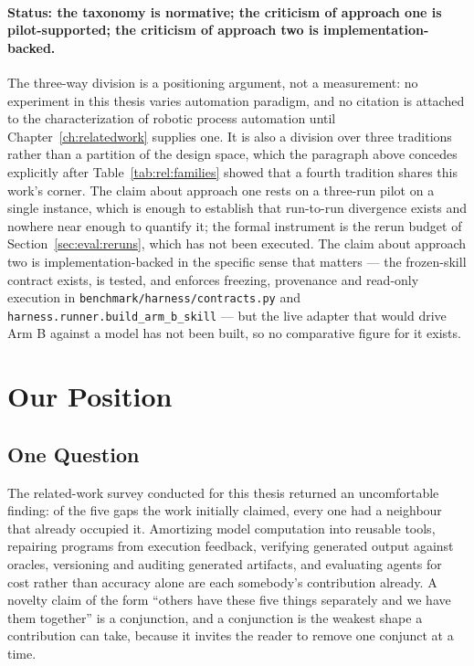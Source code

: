 \paragraph{Status: the taxonomy is normative; the criticism of approach one is
pilot-supported; the criticism of approach two is implementation-backed.}
The three-way division is a positioning argument, not a measurement: no experiment in this
thesis varies automation paradigm, and no citation is attached to the characterization of
robotic process automation until Chapter~\ref{ch:relatedwork} supplies one. It is also a
division over three traditions rather than a partition of the design space, which the
paragraph above concedes explicitly after
Table~\ref{tab:rel:families} showed that a fourth tradition shares this work's corner. The claim about
approach one rests on a three-run pilot on a single instance, which is enough to establish
that run-to-run divergence exists and nowhere near enough to quantify it; the formal
instrument is the rerun budget of Section~\ref{sec:eval:reruns}, which has not been executed.
The claim about approach two is implementation-backed in the specific sense that matters ---
the frozen-skill contract exists, is tested, and enforces freezing, provenance and read-only
execution in \texttt{benchmark/harness/contracts.py} and
\texttt{harness.runner.build\_arm\_b\_skill} --- but the live adapter that would drive Arm B
against a model has not been built, so no comparative figure for it exists.

\section{Our Position}
\label{sec:intro:position}

\subsection{One Question}
\label{sec:intro:position:question}

The related-work survey conducted for this thesis returned an uncomfortable finding: of the
five gaps the work initially claimed, every one had a neighbour that already occupied it.
Amortizing model computation into reusable tools, repairing programs from execution feedback,
verifying generated output against oracles, versioning and auditing generated artifacts, and
evaluating agents for cost rather than accuracy alone are each somebody's contribution
already. A novelty claim of the form ``others have these five things separately and we have
them together'' is a conjunction, and a conjunction is the weakest shape a contribution can
take, because it invites the reader to remove one conjunct at a time.

